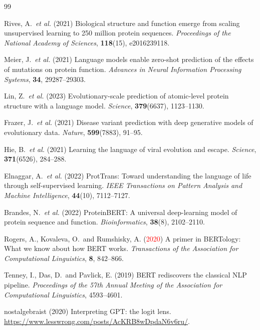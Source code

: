 \documentclass[11pt,a4paper]{article}
\newcommand{\revised}[1]{\textcolor{red}{#1}}
\begin{document}
\newpage
\begin{thebibliography}{99}


Rives, A.\ \textit{et al.} (2021)
Biological structure and function emerge from scaling unsupervised learning to 250
million protein sequences.
\textit{Proceedings of the National Academy of Sciences}, \textbf{118}(15), e2016239118.

Meier, J.\ \textit{et al.} (2021)
Language models enable zero-shot prediction of the effects of mutations on protein
function.
\textit{Advances in Neural Information Processing Systems}, \textbf{34}, 29287--29303.

Lin, Z.\ \textit{et al.} (2023)
Evolutionary-scale prediction of atomic-level protein structure with a language model.
\textit{Science}, \textbf{379}(6637), 1123--1130.

Frazer, J.\ \textit{et al.} (2021)
Disease variant prediction with deep generative models of evolutionary data.
\textit{Nature}, \textbf{599}(7883), 91--95.

Hie, B.\ \textit{et al.} (2021)
Learning the language of viral evolution and escape.
\textit{Science}, \textbf{371}(6526), 284--288.

Elnaggar, A.\ \textit{et al.} (2022)
ProtTrans: Toward understanding the language of life through self-supervised learning.
\textit{IEEE Transactions on Pattern Analysis and Machine Intelligence}, \textbf{44}(10),
7112--7127.

Brandes, N.\ \textit{et al.} (2022)
ProteinBERT: A universal deep-learning model of protein sequence and function.
\textit{Bioinformatics}, \textbf{38}(8), 2102--2110.

Rogers, A., Kovaleva, O.\ and Rumshisky, A. (\revised{2020})
A primer in BERTology: What we know about how BERT works.
\textit{Transactions of the Association for Computational Linguistics}, \textbf{8},
842--866.

Tenney, I., Das, D.\ and Pavlick, E. (2019)
BERT rediscovers the classical NLP pipeline.
\textit{Proceedings of the 57th Annual Meeting of the Association for Computational
Linguistics}, 4593--4601.

nostalgebraist (2020)
Interpreting GPT: the logit lens.
\url{https://www.lesswrong.com/posts/AcKRB8wDpdaN6v6ru/}.


\end{thebibliography}
\end{document}
